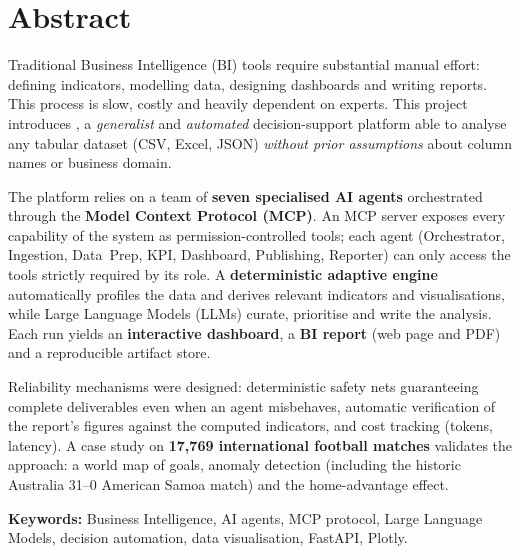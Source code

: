 \chapter*{Abstract}

Traditional Business Intelligence (BI) tools require substantial manual
effort: defining indicators, modelling data, designing dashboards and writing
reports. This process is slow, costly and heavily dependent on experts. This
project introduces \textbf{\montitre}, a \emph{generalist} and \emph{automated}
decision-support platform able to analyse any tabular dataset (CSV, Excel,
JSON) \emph{without prior assumptions} about column names or business domain.

The platform relies on a team of \textbf{seven specialised AI agents}
orchestrated through the \textbf{Model Context Protocol (MCP)}. An MCP server
exposes every capability of the system as permission-controlled tools; each
agent (Orchestrator, Ingestion, Data~Prep, KPI, Dashboard, Publishing,
Reporter) can only access the tools strictly required by its role. A
\textbf{deterministic adaptive engine} automatically profiles the data and
derives relevant indicators and visualisations, while Large Language Models
(LLMs) curate, prioritise and write the analysis. Each run yields an
\textbf{interactive dashboard}, a \textbf{BI report} (web page and PDF) and a
reproducible artifact store.

Reliability mechanisms were designed: deterministic safety nets guaranteeing
complete deliverables even when an agent misbehaves, automatic verification of
the report's figures against the computed indicators, and cost tracking
(tokens, latency). A case study on \textbf{17{,}769 international football
matches} validates the approach: a world map of goals, anomaly detection
(including the historic Australia 31--0 American Samoa match) and the
home-advantage effect.

\vspace{6pt}
\noindent\textbf{Keywords:} Business Intelligence, AI agents, MCP protocol,
Large Language Models, decision automation, data visualisation, FastAPI,
Plotly.

\cleardoublepage
